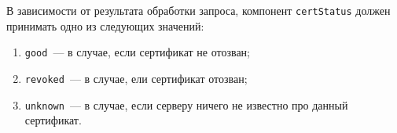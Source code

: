 
В зависимости от результата обработки запроса, компонент 
\texttt{certStatus} должен принимать одно из следующих значений: 
\begin{enumerate}
\item \texttt{good}~--- в случае, если сертификат не отозван;
\item \texttt{revoked}~--- в случае, ели сертификат отозван;
\item \texttt{unknown}~--- в случае, если серверу ничего не известно про 
данный сертификат. 
\end{enumerate}
 

